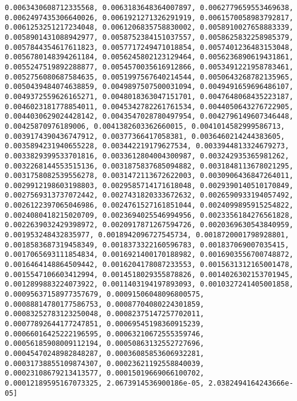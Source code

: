 \documentclass[11pt]{article}
\begin{document}
\begin{Verbatim}[commandchars=\\\{\}]
0.0063430608712335568, 0.0063183648364007897, 0.0062779659553469638, 0.0062497435306640026, 0.0061921271326291919, 0.0061570058983792817, 0.0061253251217234048, 0.0061206835758830002, 0.0058910027658883339, 0.0058901431088942977, 0.0058752384151037557, 0.0058625832258985379, 0.0057844354617611823, 0.0057717249471018854, 0.0057401236483153048, 0.0056780148394261184, 0.0056245802123129464, 0.0056236890619431861, 0.0055247519892288877, 0.0054570035616912866, 0.0053491221958783461, 0.0052756080687584635, 0.0051997567640214544, 0.0050643268782135965, 0.0050439484074638859, 0.0049897507500031094, 0.0049491659696486107, 0.0049372559626165271, 0.0048018363047151701, 0.0047648068435223187, 0.0046023181778854011, 0.0045342782261761534, 0.0044050643276722905, 0.0044030629024428142, 0.0043547028780497954, 0.0042796149607346448, 0.00425870976189006, 0.0041382603362660015, 0.0041014582999586713, 0.0039174390436747912, 0.00377366417058381, 0.0036460214244383605, 0.0035894231940655228, 0.003442219179627534, 0.0033944813324679273, 0.0033829399533701816, 0.0033612804004300987, 0.003242935365981262, 0.0032268144553515136, 0.0031875837685094882, 0.0031848113678021295, 0.0031758082539556278, 0.0031472113672622003, 0.0030906436847264011, 0.0029912198603198803, 0.0029585714171618048, 0.0029390140510170849, 0.0027569313737072442, 0.0027431820333672632, 0.0026590933194057492, 0.0026122397065046986, 0.0024761527161851044, 0.0024099895915254822, 0.0024080418215020709, 0.0023694025546994956, 0.0023356184276561828, 0.0022639032429398972, 0.0020917871267594726, 0.0020369630543840959, 0.001953248432835977, 0.0018942096727545734, 0.0018720001798928801, 0.0018583687319458349, 0.0018373322160596783, 0.001837069007035415, 0.0017065693111854834, 0.0016921400170188982, 0.0016903556700748872, 0.0016464148864509442, 0.0016204178087233553, 0.0015631312165001478, 0.0015547106603412994, 0.0014518029355878826, 0.0014026302153701945, 0.0012899883224073922, 0.0011403194197893093, 0.0010327241405001858, 0.00095637158977357679, 0.00091506048096800575, 0.00088814780177586753, 0.00087704080224301859, 0.00083252783123250048, 0.00082375147257702011, 0.00077892644177247851, 0.00069545198360915239, 0.00066016425222196595, 0.00063210672555359746, 0.00056185908009112194, 0.00050863132552727696, 0.00045470248982848287, 0.00036085853606932281, 0.00031738855109874307, 0.00023621192558840039, 0.00023108679213413577, 0.00015019669066100702, 0.00012189595167073325, 2.0673914536900186e-05, 2.0382494164243666e-05]

    \end{Verbatim}
\end{document}
